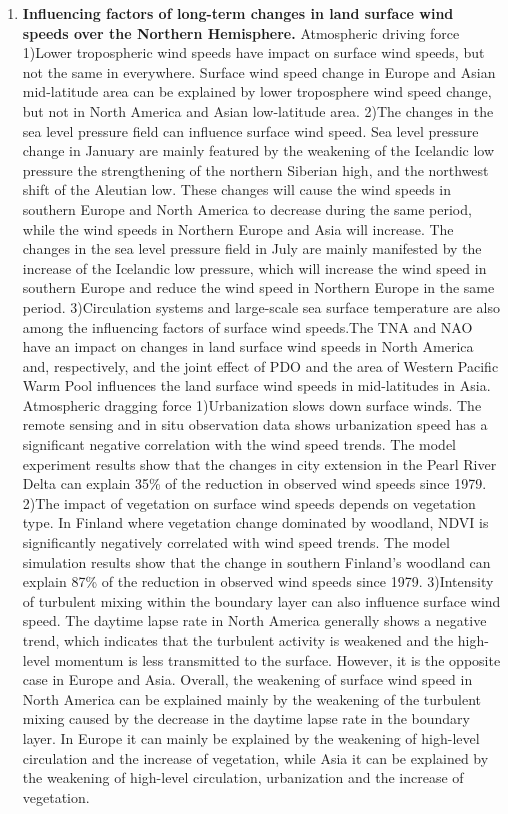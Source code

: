 \begin{enumerate}
\item  \textbf{Influencing factors of long-term changes in land surface wind speeds over the Northern Hemisphere.} Atmospheric driving force 1)Lower tropospheric wind speeds have impact on surface wind speeds, but not the same in everywhere. Surface wind speed change in Europe and Asian mid-latitude area can be explained by lower troposphere wind speed change, but not in North America and Asian low-latitude area. 2)The changes in the sea level pressure field can influence surface wind speed. Sea level pressure change in January are mainly featured by the weakening of the Icelandic low pressure the strengthening of the northern Siberian high, and the northwest shift of the Aleutian low. These changes will cause the wind speeds in southern Europe and North America to decrease during the same period, while the wind speeds in Northern Europe and Asia will increase. The changes in the sea level pressure field in July are mainly manifested by the increase of the Icelandic low pressure, which will increase the wind speed in southern Europe and reduce the wind speed in Northern Europe in the same period.  3)Circulation systems and large-scale sea surface temperature are also among the influencing factors of surface wind speeds.The TNA and NAO have an impact on changes in land surface wind speeds in North America and, respectively, and the joint effect of PDO and the area of Western Pacific Warm Pool influences the land surface wind speeds in mid-latitudes in Asia. Atmospheric dragging force 1)Urbanization slows down surface winds. The remote sensing and in situ observation data shows urbanization speed has a significant negative correlation with the wind speed trends. The model experiment results show that the changes in city extension in the Pearl River Delta can explain 35\% of the reduction in observed wind speeds since 1979. 2)The impact of vegetation on surface wind speeds depends on vegetation type. In Finland where vegetation change dominated by woodland, NDVI is significantly negatively correlated with wind speed trends. The model simulation results show that the change in southern Finland's woodland can explain 87\% of the reduction in observed wind speeds since 1979. 3)Intensity of turbulent mixing within the boundary layer can also influence surface wind speed. The daytime lapse rate in North America generally shows a negative trend, which indicates that the turbulent activity is weakened and the high-level momentum is less transmitted to the surface. However, it is the opposite case in Europe and Asia. Overall, the weakening of surface wind speed in North America can be explained mainly by the weakening of the turbulent mixing caused by the decrease in the daytime lapse rate in the boundary layer. In Europe it can mainly be explained by the weakening of high-level circulation and the increase of vegetation, while Asia it can be explained by the weakening of high-level circulation, urbanization and the increase of vegetation.


\end{enumerate}
